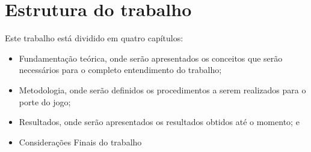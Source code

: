 \section*{Estrutura do trabalho}

Este trabalho está dividido em quatro capítulos:

\begin{itemize}
  \item Fundamentação teórica, onde serão apresentados os conceitos que serão necessários para o completo entendimento do trabalho;
  \item Metodologia, onde serão definidos os procedimentos a serem realizados para o porte do jogo;
  \item Resultados, onde serão apresentados os resultados obtidos até o momento; e
  \item Considerações Finais do trabalho
\end{itemize}